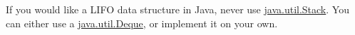 \documentclass[aspectratio=169, 14pt]{beamer}
\begin{document}
{
\begin{frame}[standout]
	If you would like a LIFO data structure in Java, never use \href{https://docs.oracle.com/en/java/javase/11/docs/api/java.base/java/util/Stack.html}{java.util.Stack}. You can either use a \href{https://docs.oracle.com/en/java/javase/17/docs/api/java.base/java/util/Deque.html}{java.util.Deque}, or implement it on your own.
\end{frame}
}
\end{document}
